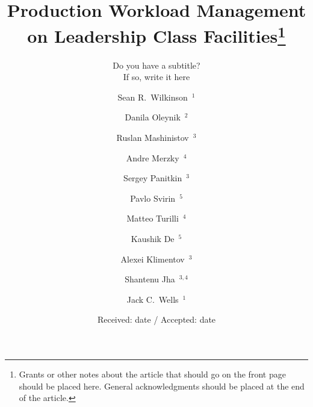 \documentclass[smallextended]{svjour3}      %
\begin{document}
\title{Production Workload Management on Leadership Class Facilities\thanks{Grants or other notes about the article that should go on the front page should be
placed here. General acknowledgments should be placed at the end of the article.}
}
\subtitle{Do you have a subtitle?\\ If so, write it here}


\author{%
    Sean R.\ Wilkinson~$^1$ \and
    Danila Oleynik~$^2$ \and
    Ruslan Mashinistov~$^3$ \and
    Andre Merzky~$^4$ \and
    Sergey Panitkin~$^3$ \and
    Pavlo Svirin~$^5$ \and
    Matteo Turilli~$^4$ \and
    Kaushik De~$^5$ \and
    Alexei Klimentov~$^3$ \and
    Shantenu Jha~$^{3, 4}$ \and
    Jack C.\ Wells~$^1$
}



\date{Received: date / Accepted: date}

\maketitle

\end{document}
